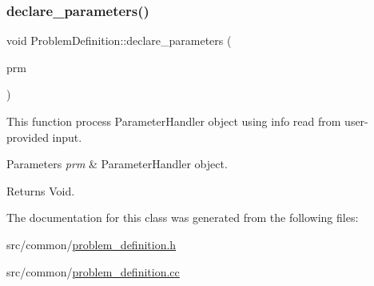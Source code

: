 \subsubsection{\texorpdfstring{declare\+\_\+parameters()}{declare\_parameters()}}
{\footnotesize\ttfamily void Problem\+Definition\+::declare\+\_\+parameters (\begin{DoxyParamCaption}\item[{Parameter\+Handler \&}]{prm }\end{DoxyParamCaption})\hspace{0.3cm}{\ttfamily [static]}}

This function process Parameter\+Handler object using info read from user-\/provided input.


\begin{DoxyParams}{Parameters}
{\em prm} & Parameter\+Handler object. \\
\hline
\end{DoxyParams}
\begin{DoxyReturn}{Returns}
Void. 
\end{DoxyReturn}


The documentation for this class was generated from the following files\+:\begin{DoxyCompactItemize}
\item 
src/common/\hyperlink{problem__definition_8h}{problem\+\_\+definition.\+h}\item 
src/common/\hyperlink{problem__definition_8cc}{problem\+\_\+definition.\+cc}\end{DoxyCompactItemize}
